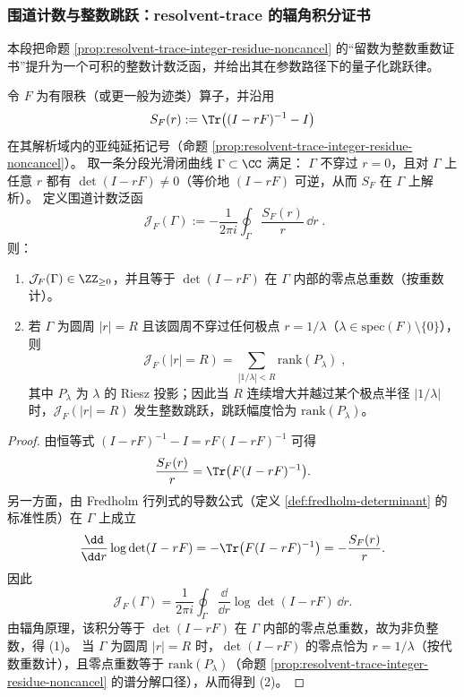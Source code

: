 \subsubsection{围道计数与整数跳跃：resolvent-trace 的辐角积分证书}\label{subsubsec:operator-resolvent-trace-jump-index}
本段把命题 \ref{prop:resolvent-trace-integer-residue-noncancel} 的“留数为整数重数证书”提升为一个可积的整数计数泛函，并给出其在参数路径下的量子化跳跃律。

\begin{theorem}\label{thm:operator-resolvent-trace-jump-index}
令 \(F\) 为有限秩（或更一般为迹类）算子，并沿用
\[
S_F(r):=\Tr\bigl((I-rF)^{-1}-I\bigr)
\]
在其解析域内的亚纯延拓记号（命题 \ref{prop:resolvent-trace-integer-residue-noncancel}）。
取一条分段光滑闭曲线 \(\Gamma\subset\CC\) 满足：
\(\Gamma\) 不穿过 \(r=0\)，且对 \(\Gamma\) 上任意 \(r\) 都有 \(\det(I-rF)\neq 0\)（等价地 \((I-rF)\) 可逆，从而 \(S_F\) 在 \(\Gamma\) 上解析）。
定义围道计数泛函
\[
\boxed{\;
\mathcal J_F(\Gamma):=-\frac{1}{2\pi i}\oint_{\Gamma}\frac{S_F(r)}{r}\,\dd r\; }.
\]
则：
\begin{enumerate}
  \item \(\mathcal J_F(\Gamma)\in\ZZ_{\ge 0}\)，并且等于 \(\det(I-rF)\) 在 \(\Gamma\) 内部的零点总重数（按重数计）。
  \item 若 \(\Gamma\) 为圆周 \(|r|=R\) 且该圆周不穿过任何极点 \(r=1/\lambda\)（\(\lambda\in\mathrm{spec}(F)\setminus\{0\}\)），则
  \[
  \boxed{\;
  \mathcal J_F(|r|=R)
  =\sum_{|1/\lambda|<R}\mathrm{rank}(P_\lambda)\;},
  \]
  其中 \(P_\lambda\) 为 \(\lambda\) 的 Riesz 投影；因此当 \(R\) 连续增大并越过某个极点半径 \(|1/\lambda|\) 时，\(\mathcal J_F(|r|=R)\) 发生整数跳跃，跳跃幅度恰为 \(\mathrm{rank}(P_\lambda)\)。
\end{enumerate}
\end{theorem}
\begin{proof}
由恒等式
\(
(I-rF)^{-1}-I=rF(I-rF)^{-1}
\)
可得
\[
\frac{S_F(r)}{r}=\Tr\bigl(F(I-rF)^{-1}\bigr).
\]
另一方面，由 Fredholm 行列式的导数公式（定义 \ref{def:fredholm-determinant} 的标准性质）在 \(\Gamma\) 上成立
\[
\frac{\dd}{\dd r}\log\det(I-rF)=-\Tr\bigl(F(I-rF)^{-1}\bigr)=-\frac{S_F(r)}{r}.
\]
因此
\[
\mathcal J_F(\Gamma)
=\frac{1}{2\pi i}\oint_{\Gamma}\frac{\dd}{\dd r}\log\det(I-rF)\,\dd r.
\]
由辐角原理，该积分等于 \(\det(I-rF)\) 在 \(\Gamma\) 内部的零点总重数，故为非负整数，得 (1)。
当 \(\Gamma\) 为圆周 \(|r|=R\) 时，\(\det(I-rF)\) 的零点恰为 \(r=1/\lambda\)（按代数重数计），且零点重数等于 \(\mathrm{rank}(P_\lambda)\)（命题 \ref{prop:resolvent-trace-integer-residue-noncancel} 的谱分解口径），从而得到 (2)。
\end{proof}

